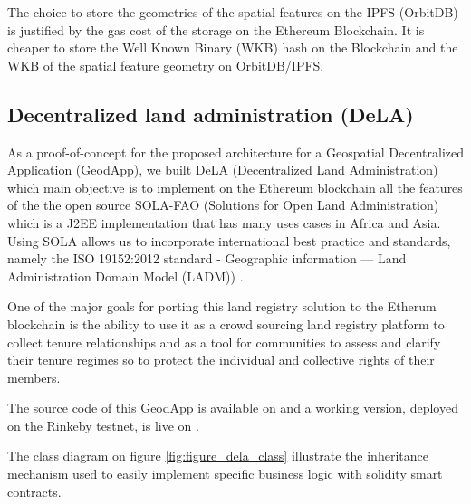 \documentclass{isprs} %
\begin{document}
The choice to store the geometries of the spatial features on the IPFS (OrbitDB) is justified by the gas cost of the storage on the Ethereum Blockchain. It is cheaper to store the Well Known Binary (WKB) hash on the Blockchain and the WKB of the spatial feature geometry on OrbitDB/IPFS.

\subsection{Decentralized land administration (DeLA)}\label{sec:Decentralized land administration (DeLA)}

As a proof-of-concept for the proposed architecture for a Geospatial Decentralized Application (GeodApp), we built DeLA  (Decentralized Land Administration) which main objective is to implement on the Ethereum blockchain all the features of the the open source SOLA-FAO (Solutions for Open Land Administration) \cite{sola} which is a J2EE implementation that has many uses cases in Africa and Asia. Using SOLA allows us to incorporate international best practice and standards, namely the ISO 19152:2012 standard - Geographic information — Land Administration Domain Model (LADM)) \cite{van2013iso}.

One of the major goals for porting this land registry solution to the Etherum blockchain is the ability to use it as a crowd sourcing land registry platform \cite{seufert2013fao} to collect tenure relationships and as a tool for communities to assess and clarify their tenure regimes so to protect the individual and collective rights of their members. 

The source code of this GeodApp is available on \cite{dela_live} and a working version, deployed on the Rinkeby testnet, is live on \cite{github_allilou_dela}.

The class diagram on figure \ref{fig:figure_dela_class} illustrate the inheritance mechanism used to easily implement specific business logic with solidity smart contracts.
\end{document}
